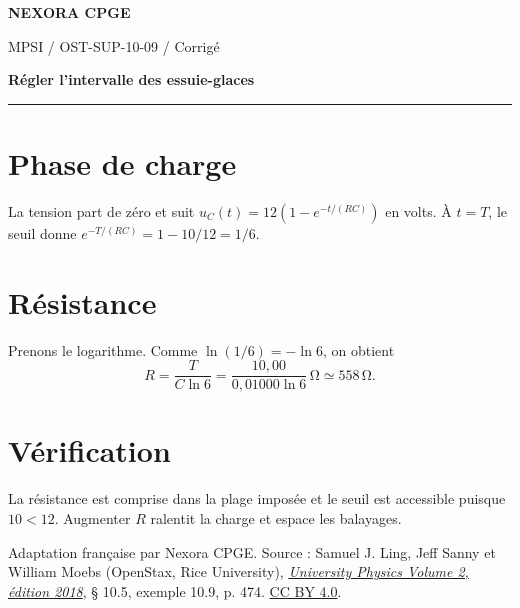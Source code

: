 \documentclass[11pt,a4paper]{article}
\begin{document}
\makeatletter
\def\@oddfoot{\footnotesize Download for free at \url{https://openstax.org/details/books/university-physics-volume-2}.\hfil\thepage}
\let\@evenfoot\@oddfoot
\makeatother
{\small\bfseries\color{nexorablue} NEXORA CPGE}\par
{\small MPSI / OST-SUP-10-09 / Corrigé}\par
{\LARGE\bfseries Régler l’intervalle des essuie-glaces}\par
\vspace{0.25em}\hrule\vspace{0.6em}

\section*{Phase de charge}
La tension part de zéro et suit $u_C(t)=12(1-e^{-t/(RC)})$ en volts. À $t=T$, le seuil donne $e^{-T/(RC)}=1-10/12=1/6$.

\section*{Résistance}
Prenons le logarithme. Comme $\ln(1/6)=-\ln 6$, on obtient
\[ R=\frac{T}{C\ln6}=\frac{10{,}00}{0{,}01000\ln6}\,\mathrm\Omega\simeq558\,\mathrm\Omega. \]

\section*{Vérification}
La résistance est comprise dans la plage imposée et le seuil est accessible puisque $10<12$. Augmenter $R$ ralentit la charge et espace les balayages.

\bigskip
{\footnotesize Adaptation française par Nexora CPGE. Source : Samuel J. Ling, Jeff Sanny et William Moebs (OpenStax, Rice University),
\href{https://d3bxy9euw4e147.cloudfront.net/oscms-prod/media/documents/UniversityPhysicsVolume2-OP.pdf\#page=484}{\textit{University Physics Volume 2, édition 2018}}, § 10.5, exemple 10.9, p. 474.
\href{https://creativecommons.org/licenses/by/4.0/}{CC BY 4.0}.}
\end{document}

